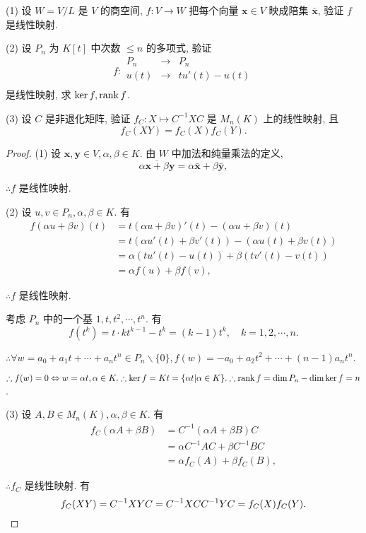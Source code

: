 \documentclass[color=black,device=normal,lang=cn,mode=geye]{elegantnote}
\begin{document}
\begin{exercise}\label{ex1.2}
    (1) 设 $W=V/L$ 是 $V$ 的商空间, $f:V\to W$ 把每个向量 $\boldsymbol{x}\in V$ 映成陪集 $\bar{\boldsymbol{x}}$, 验证 $f$ 是线性映射.

    (2) 设 $P_n$ 为 $K[t]$ 中次数 $\leq n$ 的多项式, 验证
    \[f:\begin{array}{rcl}
        P_n & \to & P_n \\
        u(t) & \to & tu'(t)-u(t) \\
    \end{array}\]
    是线性映射, 求 $\ker f,\operatorname{rank} f$.

    (3) 设 $C$ 是非退化矩阵, 验证 $f_C:X\mapsto C^{-1}XC$ 是 $M_n(K)$ 上的线性映射, 且
    \[f_C(XY)=f_C(X)f_C(Y).\]
\end{exercise}
\begin{proof}
    (1) 设 $\boldsymbol{x},\boldsymbol{y}\in V,\alpha,\beta\in K$. 由 $W$ 中加法和纯量乘法的定义,
    \[\overline{\alpha\boldsymbol{x}+\beta\boldsymbol{y}}=\alpha\bar{\boldsymbol{x}}+\beta\bar{\boldsymbol{y}},\]

    $\therefore f$ 是线性映射.

    (2) 设 $u,v\in P_n,\alpha,\beta\in K$. 有
    \begin{align*}
        f(\alpha u+\beta v)(t) & =t(\alpha u+\beta v)'(t)-(\alpha u+\beta v)(t) \\
        & =t(\alpha u'(t)+\beta v'(t))-(\alpha u(t)+\beta v(t)) \\
        & =\alpha(tu'(t)-u(t))+\beta(tv'(t)-v(t)) \\
        & =\alpha f(u)+\beta f(v),
    \end{align*}

    $\therefore f$ 是线性映射.

    考虑 $P_n$ 中的一个基 $1,t,t^2,\cdots,t^n$. 有
    \[f(t^k)=t\cdot kt^{k-1}-t^k=(k-1)t^k,\quad k=1,2,\cdots,n.\]

    $\therefore\forall w=a_0+a_1t+\cdots+a_nt^n\in P_n\backslash\{0\},f(w)=-a_0+a_2t^2+\cdots+(n-1)a_nt^n$.

    $\therefore f(w)=0\Leftrightarrow w=\alpha t,\alpha\in K.\therefore\ker f=Kt=\{\alpha t|\alpha\in K\}.\therefore\operatorname{rank} f=\dim P_n-\dim\ker f=n$.

    (3) 设 $A,B\in M_n(K),\alpha,\beta\in K$. 有
    \begin{align*}
        f_C(\alpha A+\beta B) & =C^{-1}(\alpha A+\beta B)C \\
        & =\alpha C^{-1}AC+\beta C^{-1}BC \\
        & =\alpha f_C(A)+\beta f_C(B),
    \end{align*}

    $\therefore f_C$ 是线性映射. 有
    \[f_C(XY)=C^{-1}XYC=C^{-1}XCC^{-1}YC=f_C(X)f_C(Y).\qedhere\]
\end{proof}
\end{document}
